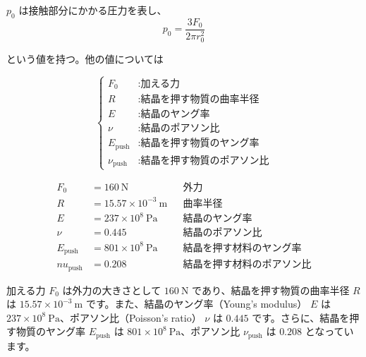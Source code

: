 $p_0$ は接触部分にかかる圧力を表し、
\begin{equation}
p_0 = \frac{3 F_0}{2 \pi r_0^2}
\end{equation}

という値を持つ。他の値については

\begin{equation}
\left\{
\begin{aligned}
F_0 &: \text{加える力} \\
R &: \text{結晶を押す物質の曲率半径} \\
E &: \text{結晶のヤング率} \\
\nu &: \text{結晶のポアソン比} \\
E_{\text{push}} &: \text{結晶を押す物質のヤング率} \\
\nu_{\text{push}} &: \text{結晶を押す物質のポアソン比}
\end{aligned}
\right.
\end{equation}

\begin{align*}
F_0 &= 160~\text{N} && \text{外力} \\
R &= 15.57 \times 10^{-3}~\text{m} && \text{曲率半径} \\
E &= 237 \times 10^{8}~\text{Pa} && \text{結晶のヤング率} \\
\nu &= 0.445 && \text{結晶のポアソン比} \\
E_{\text{push}} &= 801 \times 10^{8}~\text{Pa} && \text{結晶を押す材料のヤング率} \\
nu_{\text{push}} &= 0.208 && \text{結晶を押す材料のポアソン比}
\end{align*}

加える力 \( F_0 \) は外力の大きさとして \( 160~\text{N} \) であり、結晶を押す物質の曲率半径 \( R \) は \( 15.57 \times 10^{-3}~\text{m} \) です。また、結晶のヤング率（Young's modulus） \( E \) は \( 237 \times 10^{8}~\text{Pa} \)、ポアソン比（Poisson's ratio） \( \nu \) は \( 0.445 \) です。さらに、結晶を押す物質のヤング率 \( E_{\text{push}} \) は \( 801 \times 10^{8}~\text{Pa} \)、ポアソン比 \( \nu_{\text{push}} \) は \( 0.208 \) となっています。


